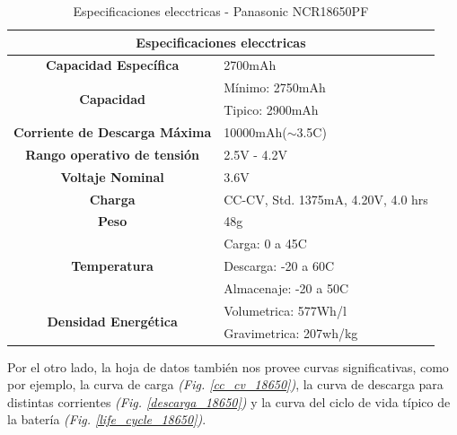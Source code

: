 \documentclass[10pt,a4paper]{article}
\begin{document}
	\begin{table}[h]
		\begin{center}
			\begin{tabular}{|c|l|}
				\hline
                \multicolumn{2}{|c|}{Especificaciones elecctricas}                          \\ \hline
				\textbf{Capacidad Específica}                 & 2700mAh                            \\ \hline
				\multirow{2}{*}{\textbf{Capacidad}}           & Mínimo: 2750mAh                    \\ \cline{2-2} 
				& Tipico: 2900mAh                    \\ \hline
				\textbf{Corriente de Descarga Máxima}         & 10000mAh($\sim$3.5C)               \\ \hline
				\textbf{Rango operativo de tensión}           & 2.5V - 4.2V                        \\ \hline
				\textbf{Voltaje Nominal}                      & 3.6V                               \\ \hline
				\textbf{Charga}                               & CC-CV, Std. 1375mA, 4.20V, 4.0 hrs \\ \hline
				\textbf{Peso}                                 & 48g                              \\ \hline
				\multirow{3}{*}{\textbf{Temperatura}}         & Carga: 0 a 45C                     \\ \cline{2-2} 
				& Descarga: -20 a 60C                \\ \cline{2-2} 
				& Almacenaje: -20 a 50C              \\ \hline
				\multirow{2}{*}{\textbf{Densidad Energética}} & Volumetrica: 577Wh/l               \\ \cline{2-2} 
				& Gravimetrica: 207wh/kg             \\ \hline
			\end{tabular}%
		\end{center}
        \caption{Especificaciones elecctricas - Panasonic NCR18650PF}
        \label{table:ncr}
	\end{table}
	
	Por el otro lado, la hoja de datos también nos provee curvas significativas, 
    como por ejemplo, la curva de carga \emph{(Fig. \ref{cc_cv_18650})}, 
    la curva de descarga para distintas corrientes 
    \emph{(Fig. \ref{descarga_18650})} y la curva del ciclo de vida típico de 
    la batería \emph{(Fig. \ref{life_cycle_18650})}.
	
\end{document}
